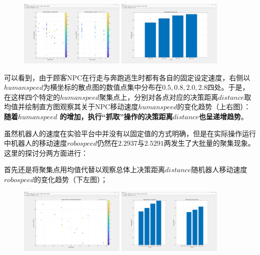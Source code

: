 \documentclass[12pt]{article}  %
\begin{document}
	\begin{figure}[H]
		\centering
		\includegraphics[width=0.45\textwidth]{3.png}
		\includegraphics[width=0.45\textwidth]{4.png}
	\end{figure}
	
	可以看到，由于顾客NPC在行走与奔跑逃生时都有各自的固定设定速度，右侧以$humanspeed$为横坐标的散点图的数值点集中分布在$0.5,0.8,2.0,2.8$四处。于是，在这样四个特定的$humanspeed$聚集点上，分别对各点对应的决策距离$distance$取均值并绘制直方图观察其关于NPC移动速度$humanspeed$的变化趋势（上右图）：\textbf{随着$humanspeed$ 的增加，执行“抓取”操作的决策距离$distance$也呈递增趋势}。
	
	虽然机器人的速度在实验平台中并没有以固定值的方式明确，但是在实际操作运行中机器人的移动速度$robospeed$仍然在$2.2937$与$2.5291$两发生了大批量的聚集现象。这里的探讨分两方面进行：
	
	首先还是将聚集点用均值代替以观察总体上决策距离$distance$随机器人移动速度 $robospeed$的变化趋势（下左图）；
	
	\begin{figure}[H]
		\centering
		\includegraphics[width=0.45\textwidth]{5.png}
		\includegraphics[width=0.45\textwidth]{6.png}
	\end{figure}
	
\end{document}

